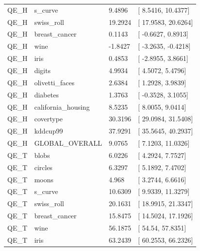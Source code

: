\documentclass[
]{article}
\providecommand{\DIFadd}[1]{{\protect\color{blue} #1}} %
\begin{document}
{\begin{longtable}[]{@{}llll@{}}
\DIFadd{QE\_H }& \DIFadd{s\_curve }& \DIFadd{9.4896 }& {[}\DIFadd{8.5416, 10.4377}{]} \\
\DIFadd{QE\_H }& \DIFadd{swiss\_roll }& \DIFadd{19.2924 }& {[}\DIFadd{17.9583, 20.6264}{]} \\
\DIFadd{QE\_H }& \DIFadd{breast\_cancer }& \DIFadd{0.1143 }& {[}\DIFadd{-0.6627, 0.8913}{]} \\
\DIFadd{QE\_H }& \DIFadd{wine }& \DIFadd{-1.8427 }& {[}\DIFadd{-3.2635, -0.4218}{]} \\
\DIFadd{QE\_H }& \DIFadd{iris }& \DIFadd{0.4853 }& {[}\DIFadd{-2.8955, 3.8661}{]} \\
\DIFadd{QE\_H }& \DIFadd{digits }& \DIFadd{4.9934 }& {[}\DIFadd{4.5072, 5.4796}{]} \\
\DIFadd{QE\_H }& \DIFadd{olivetti\_faces }& \DIFadd{2.6384 }& {[}\DIFadd{1.2928, 3.9839}{]} \\
\DIFadd{QE\_H }& \DIFadd{diabetes }& \DIFadd{1.3763 }& {[}\DIFadd{-0.3528, 3.1055}{]} \\
\DIFadd{QE\_H }& \DIFadd{california\_housing }& \DIFadd{8.5235 }& {[}\DIFadd{8.0055, 9.0414}{]} \\
\DIFadd{QE\_H }& \DIFadd{covertype }& \DIFadd{30.3196 }& {[}\DIFadd{29.0984, 31.5408}{]} \\
\DIFadd{QE\_H }& \DIFadd{kddcup99 }& \DIFadd{37.9291 }& {[}\DIFadd{35.5645, 40.2937}{]} \\
\DIFadd{QE\_H }& \DIFadd{GLOBAL\_OVERALL }& \DIFadd{9.0765 }& {[}\DIFadd{7.1203, 11.0326}{]} \\
\DIFadd{QE\_T }& \DIFadd{blobs }& \DIFadd{6.0226 }& {[}\DIFadd{4.2924, 7.7527}{]} \\
\DIFadd{QE\_T }& \DIFadd{circles }& \DIFadd{6.3297 }& {[}\DIFadd{5.1892, 7.4702}{]} \\
\DIFadd{QE\_T }& \DIFadd{moons }& \DIFadd{4.968 }& {[}\DIFadd{3.2744, 6.6616}{]} \\
\DIFadd{QE\_T }& \DIFadd{s\_curve }& \DIFadd{10.6309 }& {[}\DIFadd{9.9339, 11.3279}{]} \\
\DIFadd{QE\_T }& \DIFadd{swiss\_roll }& \DIFadd{20.1631 }& {[}\DIFadd{18.9915, 21.3347}{]} \\
\DIFadd{QE\_T }& \DIFadd{breast\_cancer }& \DIFadd{15.8475 }& {[}\DIFadd{14.5024, 17.1926}{]} \\
\DIFadd{QE\_T }& \DIFadd{wine }& \DIFadd{56.1875 }& {[}\DIFadd{54.54, 57.8351}{]} \\
\DIFadd{QE\_T }& \DIFadd{iris }& \DIFadd{63.2439 }& {[}\DIFadd{60.2553, 66.2326}{]} \\

\end{longtable}}
\end{document}
